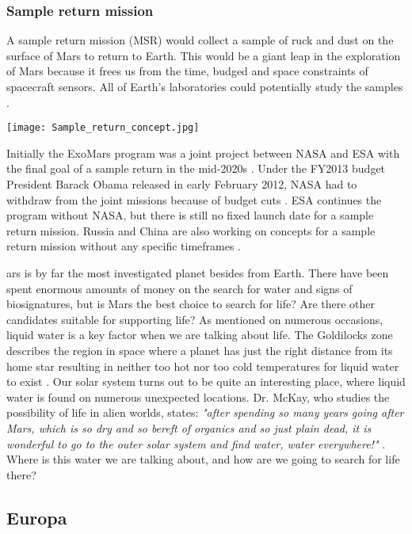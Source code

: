 \begin{multicols}{2}
\subsubsection{Sample return mission}

A sample return mission (MSR) would collect a sample of ruck and dust on the surface of Mars to return to Earth.
This would be a giant leap in the exploration of Mars because it frees us from the time, budged and space constraints of spacecraft sensors.
All of Earth’s laboratories could potentially study the samples \cite{EarthAnalysis}.
 
\begin{center}
	\texttt{[image: Sample\_return\_concept.jpg]}
\end{center}

Initially the ExoMars program was a joint project between NASA and ESA with the final goal of a sample return in the mid-2020s \cite{FPlan15}.
Under the FY2013 budget President Barack Obama released in early February 2012, NASA had to withdraw from the joint missions because of budget cuts \cite{FPlan16}.
ESA continues the program without NASA, but there is still no fixed launch date for a sample return mission.
Russia and China are also working on concepts for a sample return mission without any specific timeframes \cite{RussiaPlan} \cite{ChinaPlan}.

ars is by far the most investigated planet besides from Earth.
There have been spent enormous amounts of money on the search for water and signs of biosignatures, but is Mars the best choice to search for life?
Are there other candidates suitable for supporting life? 
As mentioned on numerous occasions, liquid water is a key factor when we are talking about life. 
The Goldilocks zone describes the region in space where a planet has just the right distance from its home star resulting in neither too hot nor too cold temperatures for liquid water to exist \cite{FPlan26}. 
Our solar system turns out to be quite an interesting place, where liquid water is found on numerous unexpected locations. 
Dr. McKay, who studies the possibility of life in alien worlds, states: \emph{"after spending so many years going after Mars, which is so dry and so bereft of organics and so just plain dead, it is wonderful to go to the outer solar system and find water, water everywhere!"} \cite{FPlan09}.
Where is this water we are talking about, and how are we going to search for life there?


\subsection{Europa}


\end{multicols}
